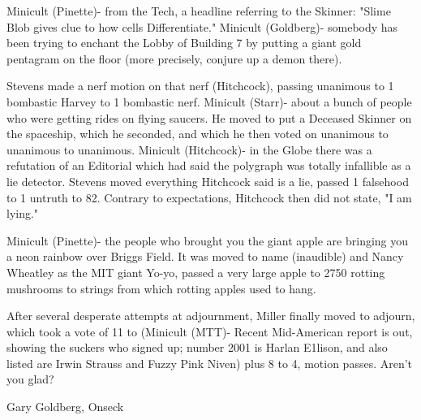 \documentclass[12pt]{article}
\begin{document}
Minicult (Pinette)- from the Tech, a headline referring to the Skinner: "Slime Blob gives clue to how cells Differentiate." Minicult (Goldberg)- somebody has been trying to enchant the Lobby of Building 7 by putting a giant gold pentagram on the floor (more precisely, conjure up a demon there).

Stevens made a nerf motion on that nerf (Hitchcock), passing unanimous to 1 bombastic Harvey to 1 bombastic nerf. Minicult (Starr)- about a bunch of people who were getting rides on flying saucers. He moved to put a Deceased Skinner on the spaceship, which he seconded, and which he then voted on unanimous to unanimous to unanimous. Minicult (Hitchcock)- in the Globe there was a refutation of an Editorial which had said the polygraph was totally infallible as a lie detector. Stevens moved everything Hitchcock said is a lie, passed 1 falsehood to 1 untruth to 82. Contrary to expectations, Hitchcock then did not state, "I am lying."

Minicult (Pinette)- the people who brought you the giant apple are bringing you a neon rainbow over Briggs Field. It was moved to name (inaudible) and Nancy Wheatley as the MIT giant Yo-yo, passed a very large apple to 2750 rotting mushrooms to strings from which rotting apples used to hang.

After several desperate attempts at adjournment, Miller finally moved to adjourn, which took a vote of 11 to (Minicult (MTT)- Recent Mid-American report is out, showing the suckers who signed up; number 2001 is Harlan E1lison, and also listed are Irwin Strauss and Fuzzy Pink Niven) plus 8 to 4, motion passes. Aren't you glad?

\vspace{12pt}

\centerline{Gary Goldberg, Onseck}
\end{document}
